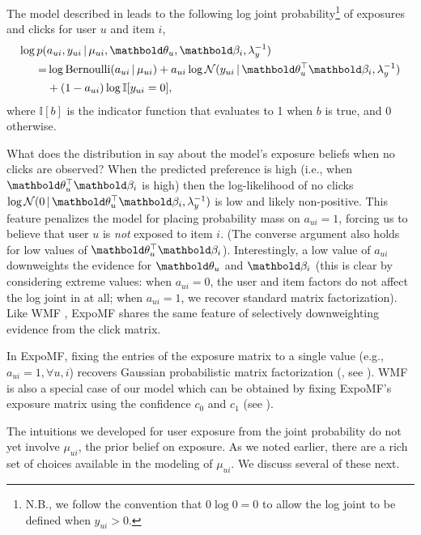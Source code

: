 The model described in 
leads to the following log joint probability\footnote{N.B., we follow the convention that $0 \log 0 = 0$ to allow the log joint to be defined when $y_{ui}>0$.} of exposures and clicks 
for user $u$ and item $i$,
\begin{equation}
\begin{split}
	\log p( & a_{ui}, y_{ui} \g \mu_{ui}, \mb\theta_u, \mb\beta_i, \lambda_y^{-1}) \\ 
	= & \log \mathrm{Bernoulli}(a_{ui} \g \mu_{ui}) + 
	a_{ui} \log \mathcal{N}(y_{ui} \g \mb\theta_u^\top \mb\beta_i, \lambda_y^{-1}) \\
	& + (1-a_{ui}) \log \mathbb{I}[y_{ui}=0], %
	\end{split}
	\label{eq:a_y_joint}
\end{equation}
where $\mathbb{I}[b]$ is the indicator function that evaluates to 1 when $b$ is true, and 0 otherwise. 

What does the distribution in  say 
about the model's exposure beliefs when no clicks are observed? 
When the predicted preference is high 
(i.e., when $\mb\theta_u^\top \mb\beta_i$ is high) 
then the log-likelihood of no clicks $\log \mathcal{N}(0 \g \mb\theta_u^\top \mb\beta_i, \lambda^{-1}_y)$ is low and likely non-positive.
This feature penalizes the model 
for placing probability mass on $a_{ui}=1$, 
forcing us to believe that user $u$ is \emph{not} exposed to item $i$. 
(The converse argument also holds for low values of $\mb\theta_u^\top \mb\beta_i$). 
Interestingly, a low value of $a_{ui}$ 
downweights the evidence for $\mb\theta_u$ and $\mb\beta_i$ 
(this is clear by considering extreme values: 
when $a_{ui}=0$, the user and item factors do not affect the log joint in  at all; 
when $a_{ui}=1$, we recover standard matrix factorization). 
Like \gls{WMF} \citep{hu2008collaborative}, ExpoMF shares the same feature of selectively downweighting evidence from the click matrix. 

In ExpoMF, fixing the entries of the exposure matrix to a single value
(e.g., $a_{ui}=1, \forall u, i$) recovers Gaussian probabilistic matrix
factorization (\citet{salakhutdinov2008probabilistic}, see ). \gls{WMF} is also a special case of
our model which can be obtained by fixing ExpoMF's exposure matrix using the confidence $c_0$ and $c_1$ (see ).

The intuitions we developed for 
user exposure from the joint probability 
do not yet involve $\mu_{ui}$, 
the prior belief on exposure. 
As we noted earlier, 
there are a rich set of choices 
available in the modeling of $\mu_{ui}$. 
We discuss several of these next.

